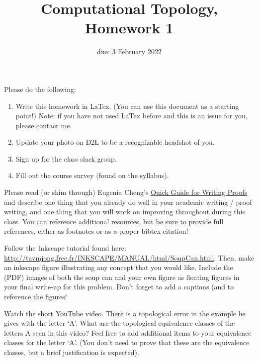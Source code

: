 \documentclass{article}
\title{Computational Topology, Homework 1}
\author{\todo{your name here}}
\date{due: 3 February 2022}
\begin{document}
\maketitle




Please do the following:
\begin{enumerate}
    \item Write this homework in LaTex.  (You can use this document as a
        starting point!)  Note: if you have not used LaTex before and this is an
        issue for you, please contact me.
    \item Update your photo on D2L to be a recognizable headshot of you.
    \item Sign up for the class slack group.
    \item Fill out the course survey (found on the syllabus).
\end{enumerate}

\nextprob{}

Please read (or skim through) Eugenia Cheng’s
\href{http://eugeniacheng.com/wp-content/uploads/2017/02/cheng-proofguide.pdf}{Quick Guide for Writing
Proofs}
and describe one thing
that you already do well in your academic writing / proof writing,
and one thing that you will work on improving
throughout during this class.  You can reference additional resources, but be
sure to provide full references, either as footnotes or as a proper bibtex
citation!

\nextprob{}

Follow the Inkscape tutorial found here:
\url{http://tavmjong.free.fr/INKSCAPE/MANUAL/html/SoupCan.html}.
Then, make an
inkscape figure illustrating any concept that you would like.
Include the (PDF) images of both the soup can and your own figure as
floating figures in
your final write-up for this problem.  Don't forget to add a captions (and to
reference the figures!

\nextprob{}
 Watch the short \href{https://youtu.be/XfWibrh6stw}{YouTube} video.
 There is a topological
 error in the example he gives with the letter `A'.  What are the topological equivalence
classes of the letters A seen in this video?  Feel free to add additional
items to your equivalence classes for the letter `A'.  (You don't need to prove
that these are the equivalence classes, but a brief justification is expected).
\end{document}
